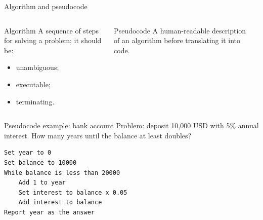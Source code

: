 \documentclass[aspectratio=169,10pt]{beamer}
\begin{document}
\begin{frame}{Algorithm and pseudocode}
\begin{columns}[T]
\begin{block}{Algorithm}
A sequence of steps for solving a problem; it should be:
\begin{itemize}
  \item unambiguous;
  \item executable;
  \item terminating.
\end{itemize}
\end{block}
\begin{block}{Pseudocode}
A human-readable description of an algorithm before translating it into code.
\end{block}

\begin{center}
\end{center}
\end{columns}
\end{frame}

\begin{frame}[fragile]{Pseudocode example: bank account}
Problem: deposit 10,000 USD with 5\% annual interest. How many years until the balance at least doubles?

\begin{lstlisting}[language={}]
Set year to 0
Set balance to 10000
While balance is less than 20000
    Add 1 to year
    Set interest to balance x 0.05
    Add interest to balance
Report year as the answer
\end{lstlisting}
\end{frame}
\end{document}
